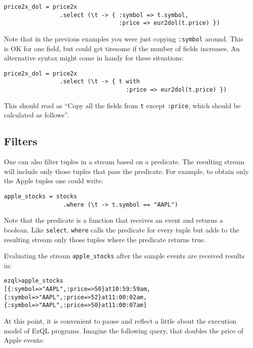 \documentclass{report}
\newenvironment{evaluation}
{
  \framed
  \begin{alltt}
}
{
  \end{alltt}
  \endframed
}
\begin{document}
\pagebreak
\begin{verbatim}
price2x_dol = price2x
                .select (\t -> { :symbol => t.symbol,
                                 :price => eur2dol(t.price) })
\end{verbatim}

Note that in the previous examples you were just copying
\verb=:symbol= around. This is OK for one field, but could get
tiresome if the number of fields increases. An alternative syntax
might come in handy for these situations:

\begin{verbatim}
price2x_dol = price2x
                .select (\t -> { t with
                                   :price => eur2dol(t.price) })
\end{verbatim}

This should read as ``Copy all the fields from \verb=t= except
\verb=:price=, which should be calculated as follows''.

\subsection{Filters}
\label{sec:filters}

One can also filter tuples in a stream based on a predicate. The
resulting stream will include only those tuples that pass the
predicate. For example, to obtain only the Apple tuples one could
write:

\begin{verbatim}
apple_stocks = stocks
                 .where (\t -> t.symbol == "AAPL")
\end{verbatim}

Note that the predicate is a function that receives an event and
returns a boolean. Like \verb=select=, \verb=where= calls the
predicate for every tuple but adds to the resulting stream only those
tuples where the predicate returns true.

Evaluating the stream \verb=apple_stocks= after the sample events are
received results in:

\begin{evaluation}
ezql> apple_stocks
[\{ :symbol => "AAPL", :price => 50 \} at 10:59:59 am,
 \{ :symbol => "AAPL", :price => 52 \} at 11:00:02 am,
 \{ :symbol => "AAPL", :price => 50 \} at 11:00:07 am]
\end{evaluation}

At this point, it is convenient to pause and reflect a little about
the execution model of EzQL programs. Imagine the following query,
that doubles the price of Apple events:
\end{document}
